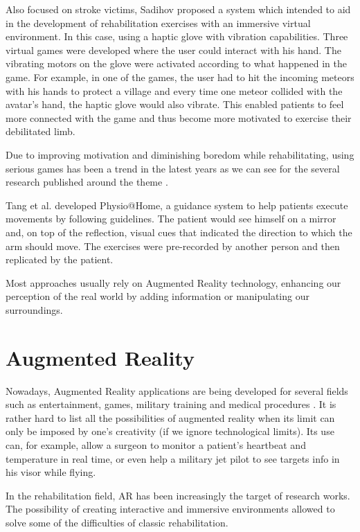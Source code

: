 Also focused on stroke victims, Sadihov \cite{Sadihov2013} proposed a system which intended to aid in the development of 
rehabilitation exercises with an immersive virtual environment. In this case, using a haptic glove with vibration capabilities.  
Three virtual games were developed where the user could interact with his hand. The vibrating motors on the glove 
were activated according to what happened in the game. For example, in one of the games, the user had to hit 
the incoming meteors with his hands to protect a village and every time one meteor collided with the avatar's hand,
the haptic glove would also vibrate. This enabled patients to feel more connected with the game and thus become more motivated to exercise their debilitated limb.

Due to improving motivation and diminishing boredom while rehabilitating, using serious games
has been a trend in the latest years as we can see for the several 
research published around the theme \cite{Schonauer2011c, Ma2008, Burke2009, Borghese2013, Lange2012}. 

Tang et al. \cite{Tang2014a} developed Physio@Home, a guidance system to help patients execute movements by following
guidelines. The patient would see himself on a mirror and, on top of the reflection, visual cues that 
indicated the direction to which the arm should move. The exercises were pre-recorded by another person and 
then replicated by the patient.

Most approaches usually rely on Augmented Reality technology, enhancing our perception of the real world
by adding information or manipulating our surroundings.  

\section{Augmented Reality}
\label{RW-AR}

Nowadays, Augmented Reality applications 
are being developed for several fields such as entertainment, games, military training 
and medical procedures \cite{Guimaraes2014a, Rego2010}. 
It is rather hard to list all the possibilities of augmented reality when its limit can only be imposed by one's creativity (if we ignore technological limits).
Its use can, for example, allow a surgeon to monitor a patient's heartbeat 
and temperature in real time, or even help a military jet pilot to see targets info in his visor while flying.

In the rehabilitation field, \ac{AR} has been increasingly the target of research works.
The possibility of creating interactive and immersive environments
allowed to solve some of the difficulties of classic rehabilitation.

